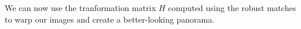 \documentclass[11pt]{article}
\begin{document}
    \begin{center}
    \end{center}
    { \hspace*{\fill} \\}
    
    \begin{center}
    \end{center}
    { \hspace*{\fill} \\}
    
    We can now use the tranformation matrix \(H\) computed using the robust
matches to warp our images and create a better-looking panorama.
\end{document}
